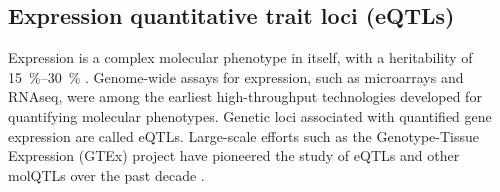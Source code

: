 \subsection{Expression quantitative trait loci (eQTLs)}

Expression is a complex molecular phenotype in itself, with a heritability of \SIrange{15}{30}{\percent} \autocite{gaffney2013GlobalPropertiesFunctional}.
Genome-wide assays for expression, such as microarrays and \gls{RNAseq}, were among the earliest high-throughput technologies developed for quantifying molecular phenotypes.
Genetic loci associated with quantified gene expression are called \glspl{eQTL}.
Large-scale efforts such as the Genotype-Tissue Expression (GTEx) project \autocite{thegtexconsortium2020GTExConsortiumAtlas} have pioneered the study of \glspl{eQTL} and other \glspl{molQTL} over the past decade \autocite{vandiedonck2017GeneticAssociationMolecular}.

